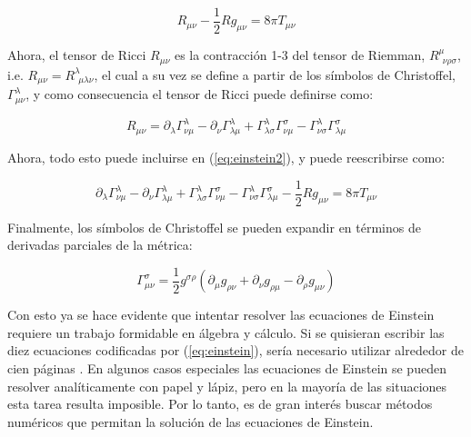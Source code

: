 \documentclass[%
 reprint,
 amsmath,amssymb,
 aps,
floatfix,
]{revtex4-1}
\newcommand{\christoffel}[3]{\Gamma^{#1}_{#2 #3}}
\begin{document}
\begin{equation}\label{eq:einstein2}%
    R_{\mu \nu} - \frac{1}{2}Rg_{\mu \nu} = 8\pi T_{\mu \nu}
\end{equation}%

Ahora, el tensor de Ricci $R_{\mu \nu}$ es la contracción 1-3 del tensor de Riemman, $R^\mu_{\hspace{5pt} \nu \rho \sigma}$, i.e. $R_{\mu \nu} = R^\lambda_{\hspace{5pt} \mu \lambda \nu}$, el cual a su vez se define a partir de los símbolos de Christoffel, $\christoffel{\lambda}{\mu}{\nu}$, y como consecuencia el tensor de Ricci puede definirse como:

\begin{equation}%
    R_{\mu \nu} = \partial_\lambda \christoffel{\lambda}{\nu}{\mu} - \partial_\nu \christoffel{\lambda}{\lambda}{\mu} + \christoffel{\lambda}{\lambda}{\sigma}\christoffel{\sigma}{\nu}{\mu} -\christoffel{\lambda}{\nu}{\sigma}\christoffel{\sigma}{\lambda}{\mu}
\end{equation}%

Ahora, todo esto puede incluirse en (\ref{eq:einstein2}), y puede reescribirse como:

\begin{equation}
    \partial_\lambda \christoffel{\lambda}{\nu}{\mu} - \partial_\nu \christoffel{\lambda}{\lambda}{\mu} + \christoffel{\lambda}{\lambda}{\sigma}\christoffel{\sigma}{\nu}{\mu} -\christoffel{\lambda}{\nu}{\sigma}\christoffel{\sigma}{\lambda}{\mu} - \frac{1}{2}Rg_{\mu \nu} = 8\pi T_{\mu \nu}
\end{equation}

Finalmente, los símbolos de Christoffel se pueden expandir en términos de derivadas parciales de la métrica:

\begin{equation}%
    \christoffel{\sigma}{\mu}{\nu} = \frac{1}{2}g^{\sigma \rho}\left(\partial_\mu g_{\rho \nu} + \partial_\nu g_{\rho \mu} -\partial_\rho g_{\mu \nu} \right)
\end{equation}%

Con esto ya se hace evidente que intentar resolver las ecuaciones de Einstein requiere un trabajo formidable en álgebra y cálculo. Si se quisieran escribir las diez ecuaciones codificadas por (\ref{eq:einstein}), sería necesario utilizar alrededor de cien páginas \cite{SimulatingeXtremeSpacetimesWhyRelativity}. En algunos casos especiales las ecuaciones de Einstein se pueden resolver analíticamente con papel y lápiz, pero en la mayoría de las situaciones esta tarea resulta imposible. Por lo tanto, es de gran interés buscar métodos numéricos que permitan la solución de las ecuaciones de Einstein.
\end{document}
